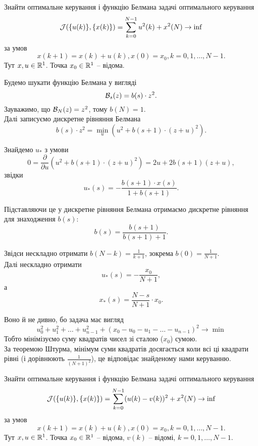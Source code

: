 \begin{problem}
	Знайти оптимальне керування і функцію Белмана задачі оптимального керування \[ \mathcal{J} ( \{ u (k) \}, \{ x (k) \} ) = \sum_{k = 0}^{N - 1} u^2 (k) + x^2 (N) \to \inf \] за умов \[ x (k + 1) = x (k) + u (k), x (0) = x_0, k = 0, 1, \ldots, N - 1. \] Тут $x, u \in \mathbb{R}^1$. Точка $x_0 \in \mathbb{R}^1$ -- відома.
\end{problem}

\begin{solution}
	Будемо шукати функцію Белмана у вигляді \[ \mathcal{B}_s(z) = b (s) \cdot z^2. \] Зауважимо, що $\mathcal{B}_N(z) = z^2$, тому $b(N) = 1$. \\

	Далі записуємо дискретне рівняння Белмана \[ b (s) \cdot z^2 = \min_u ( u^2 + b (s + 1) \cdot ( z + u )^2 ). \]

	Знайдемо $u_*$ з умови \[ 0 = \frac{\partial}{\partial u} \left( u^2 + b (s + 1) \cdot ( z + u )^2 \right) = 2 u + 2 b (s + 1) ( z + u ), \] звідки \[ u_* (s) = - \frac{ b (s + 1) \cdot x (s) }{ 1 + b (s + 1) }. \]

	Підставляючи це у дискретне рівняння Белмана отримаємо дискретне рівняння для знаходження $b (s)$: \[ b (s) = \frac{ b (s + 1) }{ b (s + 1) + 1 }. \]

	Звідси нескладно отримати $b (N - k) = \frac{1}{k + 1}$, зокрема $b (0) = \frac{1}{N + 1}$. \\

	Далі нескладно отримати \[u_* (s) = - \frac{x_0}{N + 1},\] а \[x_* (s) = \frac{ N - s }{ N + 1 } \cdot x_0.\]

	Воно й не дивно, бо задача має вигляд \[ u_0^2 + u_1^2 + \ldots + u_{n-1}^2 + (x_0 - u_0 - u_1 - \ldots - u_{n-1})^2 \to \min \] Тобто мінімізуємо суму квадратів чисел зі сталою ($x_0$) сумою. \\

	За теоремою Штурма, мінімум суми квадратів досягається коли всі ці квадрати рівні (і дорівнюють $\frac{1}{(N + 1)^2}$), це відповідає знайденому нами керуванню.
\end{solution}

\begin{problem}
	Знайти оптимальне керування і функцію Белмана задачі оптимального керування \[ \mathcal{J} ( \{ u (k) \}, \{ x (k) \} ) = \sum_{k = 0}^{N - 1} (u(k) - v(k))^2 + x^2 (N) \to \inf \] за умов \[ x (k + 1) = x (k) + u (k), x (0) = x_0, k = 0, 1, \ldots, N - 1. \] Тут $x, u \in \mathbb{R}^1$. Точка $x_0 \in \mathbb{R}^1$ -- відома, $v(k)$ -- відомі, $k=0,1,\ldots,N-1$.
\end{problem}

